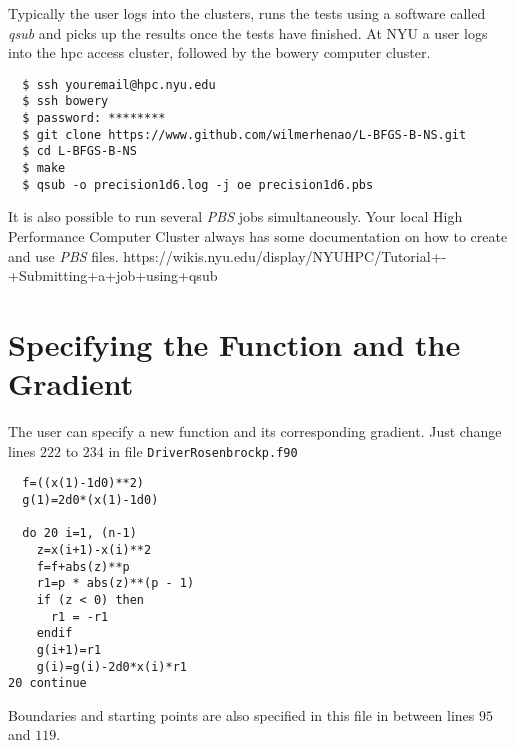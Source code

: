 Typically the user logs into the clusters, runs the tests using a software called \emph{qsub} and picks up the results once the tests have finished. At NYU a user logs into the hpc access cluster, followed by the bowery computer cluster.

\begin{lstlisting}
  $ ssh youremail@hpc.nyu.edu
  $ ssh bowery
  $ password: ********
  $ git clone https://www.github.com/wilmerhenao/L-BFGS-B-NS.git
  $ cd L-BFGS-B-NS
  $ make
  $ qsub -o precision1d6.log -j oe precision1d6.pbs
\end{lstlisting}

It is also possible to run several \emph{PBS} jobs simultaneously. Your local High Performance Computer Cluster always has some documentation on how to create and use \emph{PBS} files. https://wikis.nyu.edu/display/NYUHPC/Tutorial+-+Submitting+a+job+using+qsub

\section{Specifying the Function and the Gradient}

The user can specify a new function and its corresponding gradient. Just change lines $222$ to $234$ in file \texttt{DriverRosenbrockp.f90} 


\begin{lstlisting}
  f=((x(1)-1d0)**2)
  g(1)=2d0*(x(1)-1d0)
  
  do 20 i=1, (n-1)
    z=x(i+1)-x(i)**2
    f=f+abs(z)**p
    r1=p * abs(z)**(p - 1)
    if (z < 0) then
      r1 = -r1
    endif
    g(i+1)=r1
    g(i)=g(i)-2d0*x(i)*r1
20 continue
\end{lstlisting}

Boundaries and starting points are also specified in this file in between lines $95$ and $119$.
